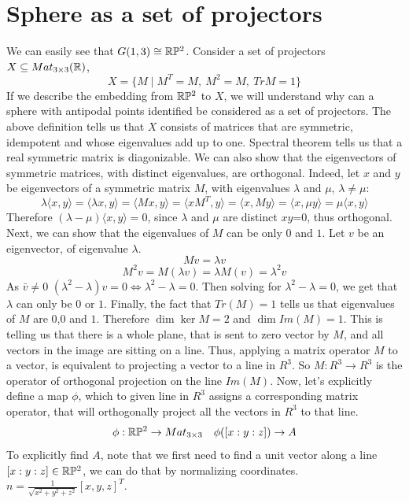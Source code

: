 \documentclass[11pt,a4paper]{report}
\begin{document}
\section{Sphere as a set of projectors} 
We can easily see that $G(1,3) \cong \mathbb{R}\mathbb{P}^2$.
Consider a set of projectors $X \subseteq Mat_{3 \times 3}(\mathbb{R})$,
$$ X = \{ M \mid M^T = M, \: M^2 = M,\: Tr M = 1 \}$$
If we describe the embedding from $\mathbb{R} \mathbb{P}^2$ to $X$, we will understand why can a sphere with antipodal points identified be considered as a set of projectors.
The above definition tells us that $X$ consists of matrices that are symmetric, idempotent and whose eigenvalues add up to one.
Spectral theorem tells us that a real symmetric matrix is diagonizable.
We can also show that the eigenvectors of symmetric matrices, with distinct eigenvalues, are orthogonal.
Indeed, let $x$ and $y$ be eigenvectors of a symmetric matrix $M$, with eigenvalues $\lambda$ and $\mu$, $\lambda \neq \mu$:
$$ \lambda \langle x,y \rangle = \langle \lambda x,  y \rangle = \langle M x, y \rangle = \langle x M^T, y \rangle = \langle x, M y \rangle = \langle x, \mu y \rangle = \mu \langle x, y \rangle  $$
Therefore $(\lambda - \mu) \langle x , y \rangle = 0$, since $\lambda$ and $\mu$ are distinct $xy$=0, thus orthogonal.
Next, we can show that the eigenvalues of $M$ can be only $0$ and $1$.
Let $v$ be an eigenvector, of eigenvalue $\lambda$.
$$ M v = \lambda v $$
$$ M^2 v = M (\lambda v) = \lambda M (v) = \lambda^2 v $$
As $\bar{v} \neq 0$ $(\lambda^2 - \lambda) v = 0 \iff \lambda^2 - \lambda = 0$.
Then solving for $\lambda^2-\lambda = 0$, we get that $\lambda$ can only be $0$ or $1$.
Finally, the fact that $Tr(M)=1$ tells us that eigenvalues of $M$ are $0$,$0$ and $1$.
Therefore $\dim \ker M = 2$ and $ \dim Im(M) = 1 $. This is telling us that there is a whole plane,
that is sent to zero vector by $M$, and all vectors in the image are sitting on a line.
\newline
Thus, applying a matrix operator $M$ to a vector,
is equivalent to projecting a vector to a line in $R^3$.
So $M :R^3 \to R^3$ is the operator of orthogonal projection on the line $Im(M)$.
\newline
Now, let's explicitly define a map $\phi$, which to given line in $R^3$ assigns a corresponding matrix operator,
that will orthogonally project all the vectors in $R^3$ to that line.
$$ \phi: \mathbb{R} \mathbb{P} ^2 \to Mat_{3 \times 3}  \quad \phi([x:y:z]) \to A $$
To explicitly find $A$, note that we first need to find a unit vector along a line $[x:y:z] \in \mathbb{R} \mathbb{P} ^2$,
we can do that by normalizing coordinates. $n = \frac{1}{\sqrt{x^2 + y^2 + z^2}} [x,y,z]^T $.
\end{document}
